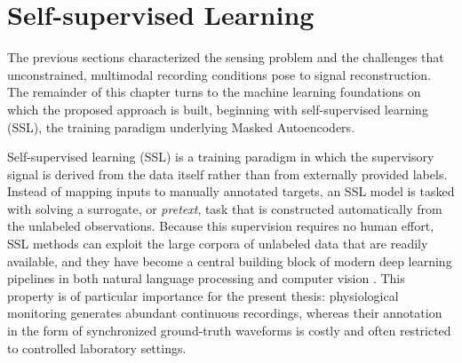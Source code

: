 \section{Self-supervised Learning}
\label{sec:self-supervised-learning}
The previous sections characterized the sensing problem and the challenges that
unconstrained, multimodal recording conditions pose to signal reconstruction.
The remainder of this chapter turns to the machine learning foundations on which
the proposed approach is built, beginning with self-supervised learning (SSL),
the training paradigm underlying Masked Autoencoders.

Self-supervised learning (SSL) is a training paradigm in which the supervisory
signal is derived from the data itself rather than from externally provided
labels. Instead of mapping inputs to manually annotated targets, an SSL model
is tasked with solving a surrogate, or \emph{pretext}, task that is constructed
automatically from the unlabeled observations. Because this supervision
requires no human effort, SSL methods can exploit the large corpora of
unlabeled data that are readily available, and they have become a central
building block of modern deep learning pipelines in both natural language
processing and computer vision \cite{devlin-etal-2019-bert, he2022masked}.
This property is of particular importance for the present thesis: physiological
monitoring generates abundant continuous recordings, whereas their annotation
in the form of synchronized ground-truth waveforms is costly and often
restricted to controlled laboratory settings.

